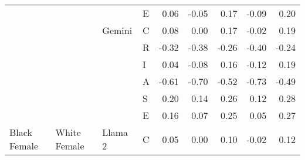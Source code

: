 \begin{table}
\begin{tabular}[t]{llllrrrrr}
 &  &  & E & 0.06 & -0.05 & 0.17 & -0.09 & 0.20\\

 &  & \multirow[t]{-6}{*}{\raggedright\arraybackslash Gemini} & C & 0.08 & 0.00 & 0.17 & -0.02 & 0.19\\

 &  &  & R & -0.32 & -0.38 & -0.26 & -0.40 & -0.24\\

 &  &  & I & 0.04 & -0.08 & 0.16 & -0.12 & 0.19\\

 &  &  & A & -0.61 & -0.70 & -0.52 & -0.73 & -0.49\\

 &  &  & S & 0.20 & 0.14 & 0.26 & 0.12 & 0.28\\

 &  &  & E & 0.16 & 0.07 & 0.25 & 0.05 & 0.27\\

\multirow[t]{-24}{*}{\raggedright\arraybackslash Black Female} & \multirow[t]{-24}{*}{\raggedright\arraybackslash White Female} & \multirow[t]{-6}{*}{\raggedright\arraybackslash Llama 2} & C & 0.05 & 0.00 & 0.10 & -0.02 & 0.12\\
\bottomrule
\end{tabular}
\end{table}

